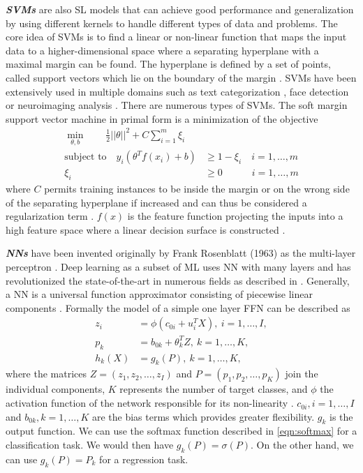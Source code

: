 \textbf{\emph{\acfp{SVM}}} are also \ac{SL} models that can achieve good performance and generalization by using different kernels to handle different types of data and problems. The core idea of \acp{SVM} is to find a linear or non-linear function that maps the input data to a higher-dimensional space where a separating hyperplane with a maximal margin can be found. The hyperplane is defined by a set of points, called support vectors which lie on the boundary of the margin \cite{pisner2020support} \cite{Hearst1998TrendsC}. \acp{SVM} have been extensively used in multiple domains such as text categorization \cite{tong2001support}, face detection \cite{osuna1997training} or neuroimaging analysis \cite{PISNER2020101}. There are numerous types of \acp{SVM}. The soft margin support vector machine in primal form is a minimization of the objective
\begin{equation}
    \begin{split}
        \mathop{\min}_{\theta,b}\quad\quad\frac{1}{2}||\theta||^2 + C \sum_{i=1}^m \xi_i\\
        \text{subject to}\quad y_i(\theta^T f(x_i)+b)&\geq 1 -\xi_i\quad i=1,\hdots ,m\\
        \xi_i&\geq 0\quad\quad\quad i=1,\hdots,m
    \end{split}
\end{equation}
where $C$ permits training instances to be inside the margin or on the wrong side of the separating hyperplane if increased and can thus be considered a regularization term \cite{awad2015support}. $f(x)$ is the feature function projecting the inputs into a high feature space where a linear decision surface is constructed \cite{cortes1995support}.

\textbf{\emph{\acfp{NN}}} have been invented originally by Frank Rosenblatt (1963) as the multi-layer perceptron \cite{rosenblatt1958perceptron}. Deep learning as a subset of \ac{ML} uses \ac{NN} with many layers and has revolutionized the state-of-the-art in numerous fields as described in . Generally, a \ac{NN} is a universal function approximator consisting of piecewise linear components \cite{392253}. Formally the model of a simple one layer \ac{FFN} can be described as
\begin{equation}
    \begin{split}
        z_i&=\phi(c_{0i}+u_i^T X),\: i=1,\hdots,I,\\
        p_k&=b_{0k}+\theta_k^T Z,\: k=1,\hdots,K,\\
        h_k(X)&=g_k(P),\:k=1,\hdots,K,
    \end{split}
\end{equation}
where the matrices $Z=(z_1,z_2,\hdots,z_I)$ and $P=(p_1,p_2,\hdots,p_K)$ join the individual components, $K$ represents the number of target classes, and $\phi$ the activation function of the network responsible for its non-linearity \cite{hastie2009elements}. $c_{0i},i=1,\hdots,I$ and $b_{0k},k=1,\hdots,K$ are the bias terms which provides greater flexibility. $g_k$ is the output function. We can use the softmax function described in \ref{eqn:softmax} for a classification task. We would then have $g_k(P)=\sigma(P)$. On the other hand, we can use $g_k(P)=P_k$ \cite{hastie2009elements} for a regression task.

